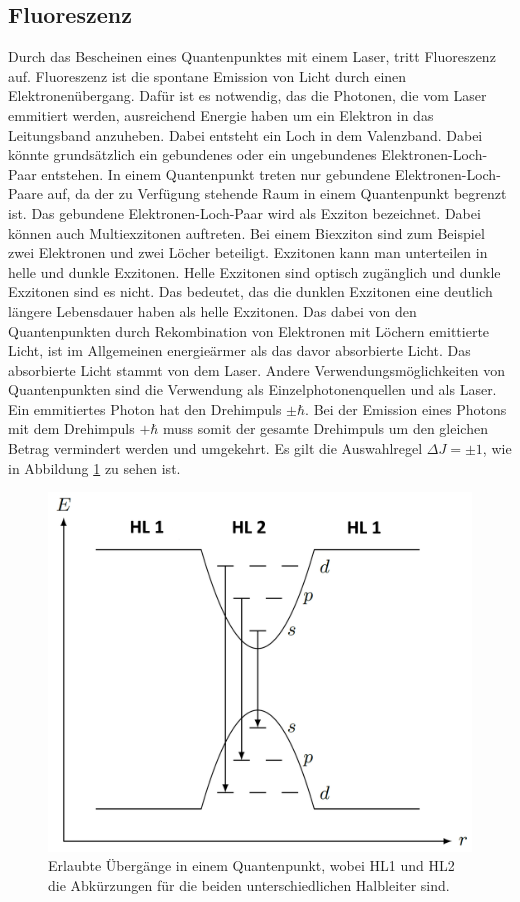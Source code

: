 \subsection{Fluoreszenz}
Durch das Bescheinen eines Quantenpunktes mit einem Laser, tritt Fluoreszenz auf. Fluoreszenz ist die spontane Emission von Licht durch einen Elektronenübergang. Dafür ist es notwendig, das die Photonen, die vom Laser emmitiert werden, ausreichend  Energie haben um ein Elektron in das Leitungsband anzuheben. Dabei entsteht ein Loch in dem Valenzband. Dabei könnte grundsätzlich  ein gebundenes oder ein ungebundenes Elektronen-Loch-Paar entstehen. 
In einem Quantenpunkt treten nur gebundene Elektronen-Loch-Paare auf, da der zu Verfügung stehende  Raum in einem Quantenpunkt begrenzt ist.
 Das gebundene Elektronen-Loch-Paar wird als Exziton bezeichnet. Dabei können auch Multiexzitonen auftreten. Bei einem Biexziton sind zum Beispiel zwei Elektronen und zwei Löcher beteiligt. 
 Exzitonen kann man unterteilen in helle und dunkle Exzitonen. 
 Helle Exzitonen  sind optisch zugänglich und dunkle Exzitonen sind es nicht. 
 Das bedeutet, das die dunklen Exzitonen eine deutlich längere Lebensdauer haben als helle Exzitonen. 
 Das dabei von den Quantenpunkten durch Rekombination von Elektronen mit Löchern emittierte Licht, ist im Allgemeinen energieärmer als das davor absorbierte Licht. Das absorbierte Licht stammt von dem Laser. 
 Andere Verwendungsmöglichkeiten von  Quantenpunkten sind die Verwendung als Einzelphotonenquellen und als Laser.
 Ein emmitiertes Photon hat den Drehimpuls $\pm \hbar$. Bei der Emission eines Photons  mit dem Drehimpuls $+ \hbar$ muss somit der gesamte Drehimpuls um den gleichen Betrag vermindert werden und umgekehrt. Es gilt die Auswahlregel $ \Delta J = \pm 1$, wie in Abbildung \ref{fig:QP_Energien} zu sehen ist.
 \begin{figure}[H]
\centering
\includegraphics[scale=0.3]{QP_Energie.PNG}
\caption{Erlaubte Übergänge in einem Quantenpunkt, wobei HL1 und HL2 die Abkürzungen für die beiden unterschiedlichen Halbleiter sind.}
\label{fig:QP_Energien}
\end{figure}
